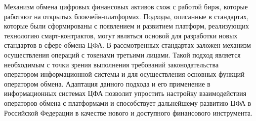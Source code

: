 \documentclass[a4paper, 10pt]{article}
\begin{document}
	Механизм обмена цифровых финансовых активов схож с работой бирж, которые работают на открытых блокчейн-платформах. Подходы, описанные в стандартах, которые были сформированы с появлением и развитием платформ, реализующих технологию смарт-контрактов, могут являться основой для разработки новых стандартов в сфере обмена ЦФА. В рассмотренных стандартах заложен механизм осуществления операций с токенами третьими лицами. Такой подход является необходимым с точки зрения выполнения требований законодательства оператором информационной системы и для осуществления основных функций оператором обмена. Адаптация данного подхода и его применение в информационных системах ЦФА позволит упростить настройку взаимодействия операторов обмена с платформами и способствует дальнейшему развитию ЦФА в Российской Федерации в качестве нового и доступного финансового инструмента.
	\newline
	
	
	
\end{document}
